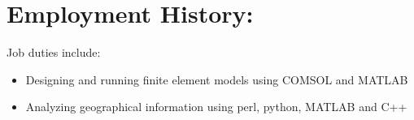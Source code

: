 \documentclass{resume}
\begin{document}
\begin{comment}
Suggested by Lisa's dad, but not by Career Services.
I think this is largely irrelevant due to my possession of a bachelors degree.
\large\textit{High School Diploma \hfill May 2005}\normalsize \\
Susitna Valley Junior Senior High School\\
\emph{Graduated with a 3.73 GPA}

New section, trying it out
Currently canning this section but THAT'S OKAY
\section*{\underline{\textit{Projects:}}}
\large\textit{Super Four-Bar Explorer \hfill December 2008}\normalsize
\small\begin{itemize}
\item A program written in python that uses a Gauss-Newton unconstrained optimization algorithm to fit the path traced by a four bar linkage to a given set of points
\item Accompanied by a spreadsheet that illustrates four-bar linkage traced paths
\end{itemize}\normalsize\medskip

Another new section, recommended by Career Services. At worst, I have the
wording for it, amirite?
\section*{\underline{\textit{Service:}}}
\tiny\begin{enumerate}
\item Administered the web site and Facebook page for ASME's UAF student chapter \hfill 2009--2010
\item Volunteered at the UAF College of Engineering and Mines' Engineer's Week Open House \hfill February 2010
\end{enumerate}\normalsize

\large\textit{Society of Automotive Engineers, UAF
Chapter\hfill2009}\normalsize\\
\textit{Treasurer}
\end{comment}

\section{Employment History:}

\normalsize
Job duties include:
\small\begin{itemize}
\item Designing and running finite element models using COMSOL and MATLAB
\item Analyzing geographical information using perl, python, MATLAB and C++
\end{itemize}\normalsize\medskip
\end{document}
